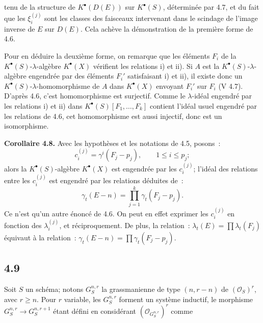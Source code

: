 tenu de la structure de \(K^{\bullet}(D(E))\) sur \(K^{\bullet}(S)\), déterminée par 4.7, et du fait que les \(\xi_i^{(j)}\) sont les classes des faisceaux intervenant dans le scindage de l'image inverse de \(E\) sur \(D(E)\). Cela achève la démonstration de la première forme de 4.6.

Pour en déduire la deuxième forme, on remarque que les éléments \(F_i\) de la \(K^{\bullet}(S)\)-\(\lambda\)-algèbre \(K^{\bullet}(X)\) vérifient les relations i) et ii). Si \(A\) est la \(K^{\bullet}(S)\)-\(\lambda\)-algèbre engendrée par des éléments \(F_i'\) satisfaisant i) et ii), il existe donc un \(K^{\bullet}(S)\)-\(\lambda\)-homomorphisme de \(A\) dans \(K^{\bullet}(X)\) envoyant \(F_i'\) sur \(F_i\) (V 4.7). D'après 4.6, c'est homomorphisme est surjectif. Comme le \(\lambda\)-idéal engendré par les relations i) et ii) dans \(K^{\bullet}(S)[F_1,\ldots,F_k]\) contient l'idéal usuel engendré par les relations de 4.6, cet homomorphisme est aussi injectif, donc est un isomorphisme.

\textbf{Corollaire 4.8.} Avec les hypothèses et les notations de 4.5, posons~:
\[
  c_i^{(j)}=\gamma^i(F_j-p_j),
  \qquad 1\le i\le p_j;
\]
alors la \(K^{\bullet}(S)\)-algèbre \(K^{\bullet}(X)\) est engendrée par les \(c_i^{(j)}\); l'idéal des relations entre les \(c_i^{(j)}\) est engendré par les relations déduites de~:
\[
  \gamma_t(E-n)=\prod_{j=1}^{k}\gamma_t(F_j-p_j).
\]
Ce n'est qu'un autre énoncé de 4.6. On peut en effet exprimer les \(c_i^{(j)}\) en fonction des \(\lambda_i^{(j)}\), et réciproquement. De plus, la relation~: \(\lambda_t(E)=\prod\lambda_t(F_j)\) équivaut à la relation~: \(\gamma_t(E-n)=\prod\gamma_t(F_j-p_j)\).

\subsection*{4.9}
Soit \(S\) un schéma; notons \(G_S^{n,r}\) la grassmanienne de type \((n,r-n)\) de \((\mathcal O_S)^r\), avec \(r\ge n\). Pour \(r\) variable, les \(G_S^{n,r}\) forment un système inductif, le morphisme \(G_S^{n,r}\longrightarrow G_S^{n,r+1}\) étant défini en considérant \((\mathcal O_{G_S^{n,r}})^r\) comme
